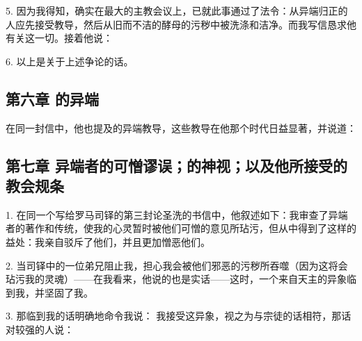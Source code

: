 5. 因为我得知，确实在最大的主教会议上，已就此事通过了法令：从异端归正的人应先接受教导，然后从旧而不洁的酵母的污秽中被洗涤和洁净。而我写信恳求他有关这一切。接着他说：\par

6.  以上是关于上述争论的话。\par


\subsection{第六章 的异端}

在同一封信中，他也提及的异端教导，这些教导在他那个时代日益显著，并说道：\par

\par


\subsection{第七章 异端者的可憎谬误；的神视；以及他所接受的教会规条}

1. 在同一个写给罗马司铎的第三封论圣洗的书信中，他叙述如下：我审查了异端者的著作和传统，使我的心灵暂时被他们可憎的意见所玷污，但从中得到了这样的益处：我亲自驳斥了他们，并且更加憎恶他们。\par

2. 当司铎中的一位弟兄阻止我，担心我会被他们邪恶的污秽所吞噬（因为这将会玷污我的灵魂）——在我看来，他说的也是实话——这时，一个来自天主的异象临到我，并坚固了我。\par

3. 那临到我的话明确地命令我说： 我接受这异象，视之为与宗徒的话相符，那话对较强的人说：\par

